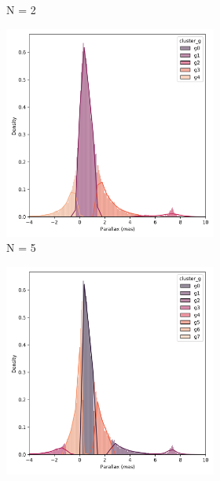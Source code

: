 \documentclass[11pt,a4paper,english,twocolumn]{article}
\begin{document}
\begin{figure}
\begin{subfigure}{\columnwidth}
\begin{subfigure}[t]{0.3\textwidth}
      \caption{N = 2}
    \end{subfigure}
    \hfill
    \begin{subfigure}[t]{0.3\textwidth}
      \centering
      \includegraphics[width=\textwidth]{../figures/kmeans/kmeans_n5_parallax_melotte_22.png}
      \caption{N = 5}
    \end{subfigure}
    \hfill
    \begin{subfigure}[t]{0.3\textwidth}
      \centering
      \includegraphics[width=\textwidth]{../figures/kmeans/kmeans_n8_parallax_melotte_22.png}

\end{subfigure}
\end{subfigure}
\end{figure}
\end{document}
